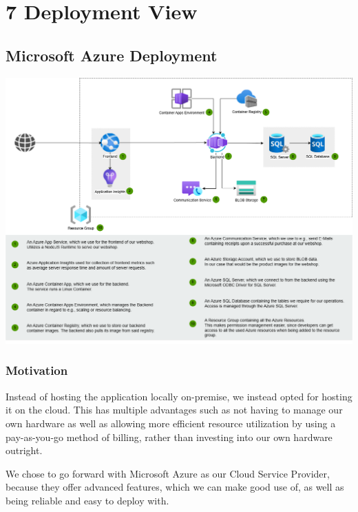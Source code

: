 \hypertarget{section-deployment-view}{%
\section{7 Deployment View}\label{section-deployment-view}}

\hypertarget{_infrastructure_level_1}{%
\subsection{Microsoft Azure Deployment}\label{_infrastructure_level_1}}

\includegraphics{images/azure_deployment_view.png}

\subsubsection{Motivation}
Instead of hosting the application locally on-premise, we instead opted for hosting it on the cloud.
This has multiple advantages such as not having to manage our own hardware as well as allowing more efficient resource utilization
by using a pay-as-you-go method of billing, rather than investing into our own hardware outright.

We chose to go forward with Microsoft Azure as our Cloud Service Provider, because they offer advanced features,
which we can make good use of, as well as being reliable and easy to deploy with.

